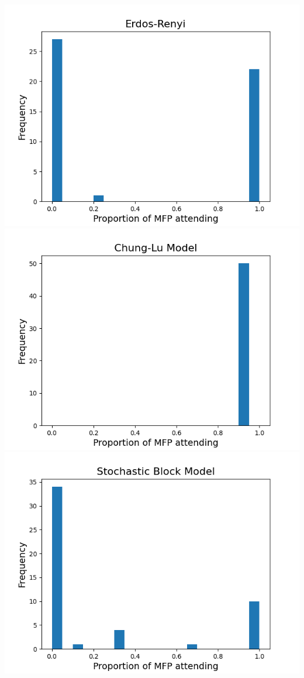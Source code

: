 \documentclass[12pt]{article}
\begin{document}
\includegraphics[scale=0.7]{gnp_attendance.png}
\includegraphics[scale=0.7]{cm_attendance.png}
\includegraphics[scale=0.7]{sbm_attendance.png}
\end{document}
